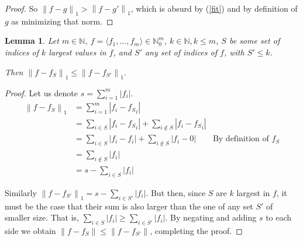 \documentclass[11pt]{amsart}
\newtheorem{lemma}[theorem]{Lemma}
\newcommand{\norm}[1]{\left\lVert #1 \right\rVert}
\begin{document}
\begin{proof}
So $\norm{f - g}_1 > \norm{f - g'}_1$, which is absurd by (\ref{fit}) and by definition of $g$ as minimizing that norm.
\end{proof}

\begin{lemma}\label{lemS2}
Let $m \in \mathbb{N}$, $f = \langle f_1, \dots, f_m \rangle \in \mathbb{N}_0^m$, $k \in \mathbb{N}, k \le m$, $S$ be some set of indices of $k$ largest values in $f$, and $S'$ any set of indices of $f$, with $S' \le k$. 

Then $\norm{f - f_S}_1 \le \norm{f - f_{S'}}_1$.
\end{lemma}

\begin{proof}
Let us denote $s = \sum_{i = 1}^m |f_i|$.
\begin{align*}
\norm{f - f_S}_1 &= \sum_{i = 1}^m |f_i - {f_S}_i|\\
                 &= \sum_{i \in S} |f_i - {f_S}_i| + \sum_{i \not\in S} |f_i - {f_S}_i|\\
                 &= \sum_{i \in S} |f_i - f_i| + \sum_{i \not\in S} |f_i - 0| & \text{By definition of }f_S\\
                 &= \sum_{i \not\in S} |f_i|\\
                 &= s - \sum_{i \in S} |f_i| 
\end{align*}

Similarly $\norm{f - f_{S'}}_1 = s - \sum_{i \in S'} |f_i|$. But then, since $S$ are $k$ largest in $f$, it must be the case that their sum is also larger than the one of any set $S'$ of smaller size. That is, $\sum_{i \in S} |f_i| \ge \sum_{i \in S'} |f_i|$. By negating and adding $s$ to each side we obtain $\norm{f - f_S} \le \norm{f - f_{S'}}$, completing the proof.
\end{proof}
\end{document}
